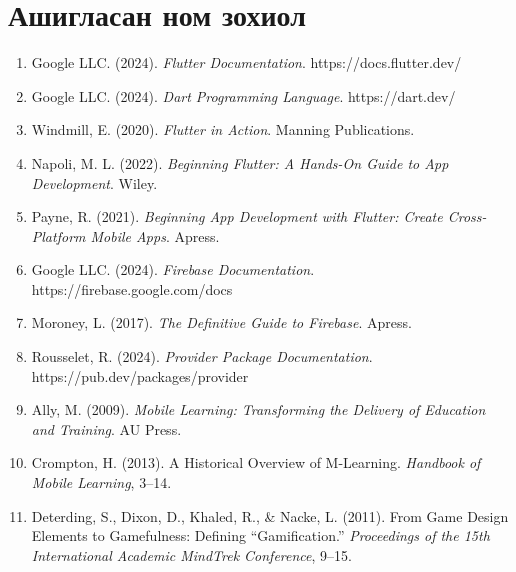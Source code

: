\newpage
\pagestyle{plain}

\chapter*{Ашигласан ном зохиол}

\begin{enumerate}

\item Google LLC. (2024). \textit{Flutter Documentation}. https://docs.flutter.dev/

\item Google LLC. (2024). \textit{Dart Programming Language}. https://dart.dev/

\item Windmill, E. (2020). \textit{Flutter in Action}. Manning Publications.

\item Napoli, M. L. (2022). \textit{Beginning Flutter: A Hands-On Guide to App Development}. Wiley.

\item Payne, R. (2021). \textit{Beginning App Development with Flutter: Create Cross-Platform Mobile Apps}. Apress.

\item Google LLC. (2024). \textit{Firebase Documentation}. https://firebase.google.com/docs

\item Moroney, L. (2017). \textit{The Definitive Guide to Firebase}. Apress.

\item Rousselet, R. (2024). \textit{Provider Package Documentation}. https://pub.dev/packages/provider

\item Ally, M. (2009). \textit{Mobile Learning: Transforming the Delivery of Education and Training}. AU Press.

\item Crompton, H. (2013). A Historical Overview of M-Learning. \textit{Handbook of Mobile Learning}, 3--14.

\item Deterding, S., Dixon, D., Khaled, R., \& Nacke, L. (2011). From Game Design Elements to Gamefulness: Defining ``Gamification.'' \textit{Proceedings of the 15th International Academic MindTrek Conference}, 9--15.


\end{enumerate}
